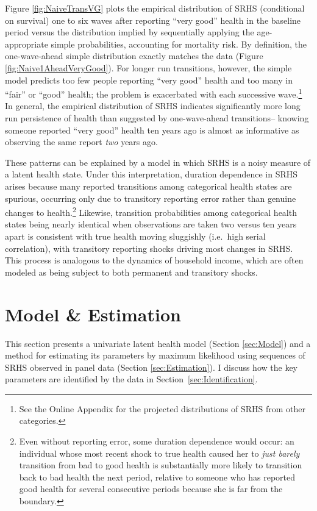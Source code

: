 \documentclass[12pt,pdftex,letterpaper]{article}
\begin{document}
Figure \ref{fig:NaiveTransVG} plots the empirical distribution of SRHS (conditional on survival) one to six waves after reporting ``very good'' health in the baseline period versus the distribution implied by sequentially applying the age-appropriate simple probabilities, accounting for mortality risk. By definition, the one-wave-ahead simple distribution exactly matches the data (Figure \ref{fig:Naive1AheadVeryGood}).  For longer run transitions, however, the simple model predicts too few people reporting ``very good'' health and too many in ``fair'' or ``good'' health; the problem is exacerbated with each successive wave.\footnote{See the Online Appendix for the projected distributions of SRHS from other categories.} In general, the empirical distribution of SRHS indicates significantly more long run persistence of health than suggested by one-wave-ahead transitions-- knowing someone reported ``very good'' health ten years ago is almost as informative as observing the same report \textit{two} years ago.

These patterns can be explained by a model in which SRHS is a noisy measure of a latent health state. Under this interpretation, duration dependence in SRHS arises because many reported transitions among categorical health states are spurious, occurring only due to transitory reporting error rather than genuine changes to health.\footnote{Even without reporting error, some duration dependence would occur: an individual whose most recent shock to true health caused her to \textit{just barely} transition from bad to good health is substantially more likely to transition back to bad health the next period, relative to someone who has reported good health for several consecutive periods because she is far from the boundary.}  Likewise, transition probabilities among categorical health states being nearly identical when observations are taken two versus ten years apart is consistent with true health moving sluggishly (i.e.\ high serial correlation), with transitory reporting shocks driving most changes in SRHS. This process is analogous to the dynamics of household income, which are often modeled as being subject to both permanent and transitory shocks.


\section{Model \& Estimation}\label{sec:ModelAndEst}

This section presents a univariate latent health model (Section \ref{sec:Model}) and a method for estimating its parameters by maximum likelihood using sequences of SRHS observed in panel data (Section \ref{sec:Estimation}). I discuss how the key parameters are identified by the data in Section~\ref{sec:Identification}.
\end{document}
